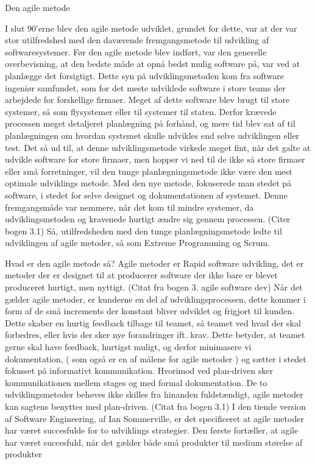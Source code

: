 Den agile metode 

I slut 90’erne blev den agile metode udviklet, grundet for dette, var at der var stor utilfredshed med den daværende fremgangsmetode til udvikling af softwaresystemer. Før den agile metode blev indført, var den generelle overbevisning, at den bedste måde at opnå bedst mulig software på, var ved at planlægge det forsigtigt. Dette syn på udviklingsmetoden kom fra software ingeniør samfundet, som for det meste udviklede software i store teams der arbejdede for forskellige firmaer. Meget af dette software blev brugt til store systemer, så som flysystemer eller til systemer til staten. Derfor krævede processen meget detaljeret planlægning på forhånd, og mere tid blev sat af til planlægningen om hvordan systemet skulle udvikles end selve udviklingen eller test. 
Det så ud til, at denne udviklingsmetode virkede meget fint, når det galte at udvikle software for store firmaer, men hopper vi ned til de ikke så store firmaer eller små forretninger, vil den tunge planlægningsmetode ikke være den mest optimale udviklings metode. Med den nye metode, fokuserede man stedet på software, i stedet for selve designet og dokumentationen af systemet. Denne fremgangsmåde var nemmere, når det kom til mindre systemer, da  udviklingsmetoden og kravenede hurtigt ændre sig gennem processen. (Citer bogen 3.1)
Så, utilfredsheden med den tunge planlægningsmetode ledte til udviklingen af agile metoder, så som Extreme Programming og Scrum. 

Hvad er den agile metode så? 
Agile metoder er Rapid software udvikling, det er metoder der er designet til at producerer software der ikke bare er blevet produceret hurtigt, men nyttigt. (Citat fra bogen 3. agile software dev) Når det gælder agile metoder, er kunderne en del af udviklingsprocessen, dette kommer i form af de små increments der konstant bliver udviklet og frigjort til kunden. Dette skaber en hurtig feedback tilbage til teamet, så teamet ved hvad der skal forbedres, eller hvis der sker nye forandringer ift. krav. Dette betyder, at teamet gerne skal have feedback, hurtigst muligt, og derfor minimasere vi dokumentation, ( som også er en af målene for agile metoder ) og sætter i stedet fokusset på informativt kommunikation. Hvorimod ved plan-driven sker kommunikationen mellem stages og med formal dokumentation. De to udviklingsmetoder behøves ikke skilles fra hinanden fuldstændigt, agile metoder kan sagtens benyttes med plan-driven. (Citat fra bogen 3.1) 
I den tiende version af Software Engineering, af Ian Sommerville, er det specificeret at agile metoder har været succesfulde for to udviklings strategier. Den første fortæller, at agile har været succesfuld, når det gælder både små produkter til medium størelse af produkter 



